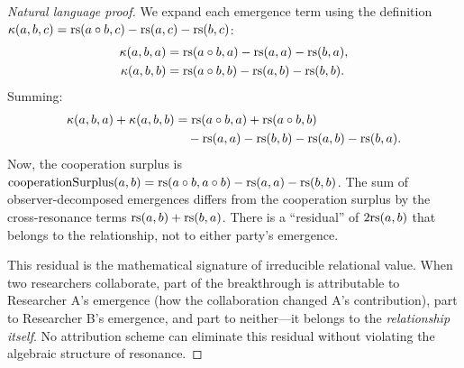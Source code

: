 \begin{proof}[Natural language proof]
We expand each emergence term using the definition
$\kappa(a,b,c) = \mathrm{rs}(a \circ b, c) - \mathrm{rs}(a,c) - \mathrm{rs}(b,c)$:
\begin{align*}
  \kappa(a,b,a) &= \mathrm{rs}(a \circ b, a) - \mathrm{rs}(a,a) - \mathrm{rs}(b,a), \\
  \kappa(a,b,b) &= \mathrm{rs}(a \circ b, b) - \mathrm{rs}(a,b) - \mathrm{rs}(b,b).
\end{align*}
Summing:
\begin{align*}
  \kappa(a,b,a) + \kappa(a,b,b) &= \mathrm{rs}(a \circ b, a) + \mathrm{rs}(a \circ b, b) \\
  &\quad - \mathrm{rs}(a,a) - \mathrm{rs}(b,b) - \mathrm{rs}(a,b) - \mathrm{rs}(b,a).
\end{align*}
Now, the cooperation surplus is
$\mathrm{cooperationSurplus}(a,b) = \mathrm{rs}(a \circ b, a \circ b)
- \mathrm{rs}(a,a) - \mathrm{rs}(b,b)$. The sum of observer-decomposed emergences differs
from the cooperation surplus by the cross-resonance terms $\mathrm{rs}(a,b) + \mathrm{rs}(b,a)$.
There is a ``residual'' of $2\mathrm{rs}(a,b)$ that belongs to the relationship,
not to either party's emergence.

This residual is the mathematical signature of irreducible relational value.
When two researchers collaborate, part of the breakthrough is attributable to
Researcher A's emergence (how the collaboration changed A's contribution),
part to Researcher B's emergence, and part to neither---it belongs to the
\emph{relationship itself}. No attribution scheme can eliminate this residual
without violating the algebraic structure of resonance.
\end{proof}

